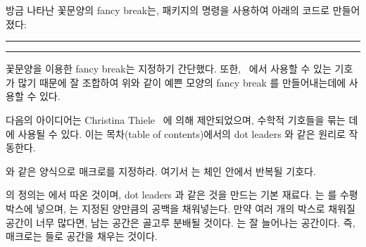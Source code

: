 방금 나타난 꽃문양의 fancy break는,
 패키지의 \cmd{\ding} 명령을 사용하여 아래의 코드로 만들어졌다:
\begin{lcode}
\renewcommand{\pfbreakdisplay}{%
  \ding{167}\quad\ding{167}\quad\ding{167}}
\fancybreak{\pfbreakdisplay}
\end{lcode}

\makeatletter
\newcommand{\motif}[1]{\cleaders\hbox{#1}\hfil}
\newcommand{\chain}[2]{\leavevmode\hbox to #2{\motif{#1}}}
\newcommand{\diamondpattern}{\m@th$\mkern-.6mu \diamond \mkern-.6mu$}
\makeatother

\fancybreak{\chain{\diamondpattern}{0.25\textwidth}}


꽃문양을 이용한 fancy break는 지정하기 간단했다.
또한, \ltx\ 에서 사용할 수 있는 기호가 많기 때문에
잘 조합하여 위와 같이 예쁜 모양의 fancy break 를 만들어내는데에 사용할 수 있다.


다음의 아이디어는 Christina Thiele~\cite{ORNAMENTAL} 에 의해 제안되었으며,
수학적 기호들을 묶는 데에 사용될 수 있다.
이는 목차(table of contents)에서의 dot leaders 와 같은 원리로 작동한다.

 와 같은 양식으로 매크로를 지정하라.
여기서 는 체인 안에서 반복될 기호다.
\begin{lcode}
\newcommand{\motif}[1]{\cleaders\hbox{#1}\hfil}
\end{lcode}
의 정의는 \tx 에서 따온 것이며, dot leaders 과 같은 것을 만드는 기본 재료다.
\cmd{\hbox} 는  를 수평 박스에 넣으며,
\cmd{\cleaders} 는 지정된 양만큼의 공백을 채워넣는다.
만약 여러 개의 박스로 채워질 공간이 너무 많다면,
남는 공간은 골고루 분배될 것이다.
\cmd{\hfil} 는 잘 늘어나는 공간이다. 
즉,  매크로는  들로 공간을 채우는 것이다.

